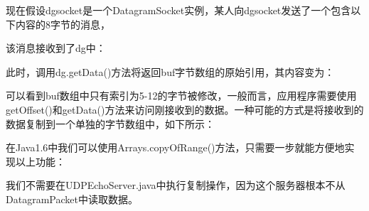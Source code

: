 		

		现在假设dgsocket是一个DatagramSocket实例，某人向dgsocket发送了一个包含以下内容的8字节的消息， 

		

		该消息接收到了dg中： 

		

		此时，调用dg.getData()方法将返回buf字节数组的原始引用，其内容变为： 

		

		可以看到buf数组中只有索引为5-12的字节被修改，一般而言，应用程序需要使用getOffset()和getData()方法来访问刚接收到的数据。一种可能的方式是将接收到的数据复制到一个单独的字节数组中，如下所示： 

		

		在Java1.6中我们可以使用Arrays.copyOfRange()方法，只需要一步就能方便地实现以上功能： 

		

		我们不需要在UDPEchoServer.java中执行复制操作，因为这个服务器根本不从DatagramPacket中读取数据。 

